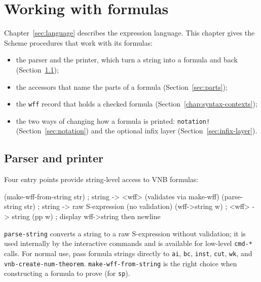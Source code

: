 \chapter{Working with formulas}
\label{ch:formulas}

Chapter~\ref{sec:language} describes the expression language.  This
chapter gives the Scheme procedures that work with its formulas:
\begin{itemize}
\item the parser and the printer, which turn a string into a formula and
  back (Section~\ref{sec:parser-printer});
\item the accessors that name the parts of a formula
  (Section~\ref{sec:parts});
\item the \texttt{wff} record that holds a checked formula
  (Section~\ref{chap:syntax-contexts});
\item the two ways of changing how a formula is printed:
  \texttt{notation!} (Section~\ref{sec:notation}) and the optional infix
  layer (Section~\ref{sec:infix-layer}).
\end{itemize}


\section{Parser and printer}
\label{sec:parser-printer}

Four entry points provide string-level access to VNB formulas:

\begin{VNBsnip}
(make-wff-from-string str)  ; string -> <wff>  (validates via make-wff)
(parse-string str)          ; string -> raw S-expression (no validation)
(wff->string w)             ; <wff>  -> string
(pp w)                      ; display wff->string then newline
\end{VNBsnip}

\noindent
\texttt{parse-string} converts a string to a raw S-expression without
validation; it is used internally by the interactive commands and is
available for low-level \texttt{cmd-*} calls.  For normal use, pass
formula strings directly to \texttt{ai}, \texttt{bc}, \texttt{inst},
\texttt{cut}, \texttt{wk}, and \texttt{vnb-create-num-theorem}.
\texttt{make-wff-from-string} is the right choice when constructing a
formula to prove (for \texttt{sp}).

